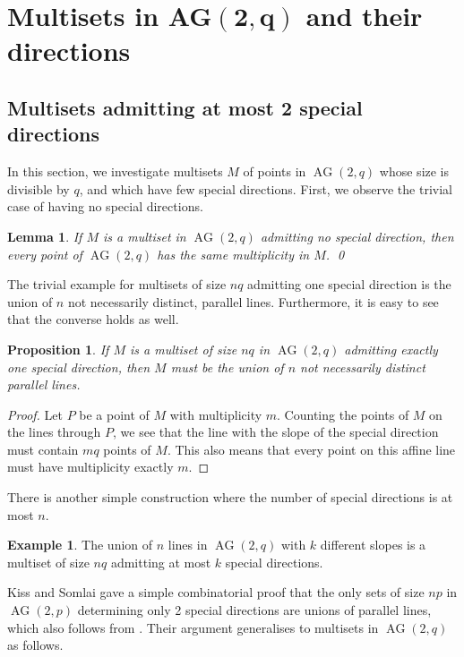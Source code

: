 \documentclass[12pt, a4paper]{article}
\newtheorem{lm}[thm]{Lemma}
\newtheorem{prop}[thm]{Proposition}
\theoremstyle{definition}
\newtheorem{ex}[thm]{Example}
\newcommand{\ceil}[1]{\left \lceil #1 \right \rceil}
\DeclareMathOperator{\AG}{AG}
\newcommand{\ag}{\AG}
\begin{document}
\section{Multisets in AG\texorpdfstring{$\boldsymbol{(2,q)}$}{(2,q)} and their directions}
 \label{Sec:ModSpecial}

\subsection{Multisets admitting at most 2 special directions}

In this section, we investigate multisets $M$ of points in $\ag(2,q)$ whose size is divisible by $q$, and which have few special directions.
First, we observe the trivial case of having no special directions.

\begin{lm}
\label{0_spec_dir}
  If $M$ is a multiset in $\ag(2,q)$ admitting no special direction, then every point of $\ag(2,q)$ has the same multiplicity in $M$. \qed
\end{lm}

The trivial example for multisets of size $nq$ admitting one special direction is the union of $n$ not necessarily distinct, parallel lines. Furthermore, it is easy to see that the converse holds as well.

\begin{prop}
\label{1_spec_dir}
  If $M$ is a multiset of size $nq$ in $\ag(2,q)$ admitting exactly one special direction, then $M$ must be the union of $n$ not necessarily distinct parallel lines.
\end{prop}

\begin{proof}
Let $P$ be a point of $M$ with multiplicity $m$. Counting the points of $M$ on the lines through $P$, we see that the line with the slope of the special direction must contain $mq$ points of $M$. This also means that every point on this affine line must have multiplicity exactly $m$.
\end{proof}

There is another simple construction where the number of special directions is at most $n$.

\begin{ex}
The union of $n$ lines in $\ag(2,q)$ with $k$ different slopes is a multiset of size $nq$ admitting at most $k$ special directions.
\end{ex}

Kiss and Somlai \cite[\S 2]{Kiss:Somlai} gave a simple combinatorial proof that the only sets of size $np$ in $\ag(2,p)$ determining only 2 special directions are unions of parallel lines, which also follows from .
Their argument generalises to multisets in $\ag(2,q)$ as follows.
\end{document}
